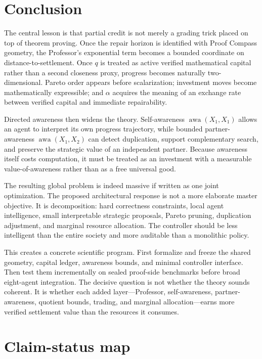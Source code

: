 \documentclass[11pt]{article}
\theoremstyle{definition}
\theoremstyle{remark}
\newcommand{\awa}{\operatorname{awa}}
\begin{document}
\section{Conclusion}

The central lesson is that partial credit is not merely a grading trick placed on top of theorem proving. Once the repair horizon is identified with Proof Compass geometry, the Professor's exponential term becomes a bounded coordinate on distance-to-settlement. Once $q$ is treated as active verified mathematical capital rather than a second closeness proxy, progress becomes naturally two-dimensional. Pareto order appears before scalarization; investment moves become mathematically expressible; and $\alpha$ acquires the meaning of an exchange rate between verified capital and immediate repairability.

Directed awareness then widens the theory. Self-awareness $\awa(X_1,X_1)$ allows an agent to interpret its own progress trajectory, while bounded partner-awareness $\awa(X_1,X_2)$ can detect duplication, support complementary search, and preserve the strategic value of an independent partner. Because awareness itself costs computation, it must be treated as an investment with a measurable value-of-awareness rather than as a free universal good.

The resulting global problem is indeed massive if written as one joint optimization. The proposed architectural response is not a more elaborate master objective. It is decomposition: hard correctness constraints, local agent intelligence, small interpretable strategic proposals, Pareto pruning, duplication adjustment, and marginal resource allocation. The controller should be less intelligent than the entire society and more auditable than a monolithic policy.

This creates a concrete scientific program. First formalize and freeze the shared geometry, capital ledger, awareness bounds, and minimal controller interface. Then test them incrementally on sealed proof-side benchmarks before broad eight-agent integration. The decisive question is not whether the theory sounds coherent. It is whether each added layer---Professor, self-awareness, partner-awareness, quotient bounds, trading, and marginal allocation---earns more verified settlement value than the resources it consumes.

\appendix
\section{Claim-status map}
\end{document}
